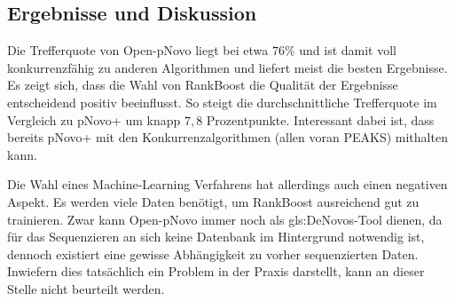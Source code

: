 \documentclass[a4paper, 12pt]{article}
\newcommand{\gerquot}[1]{\glqq#1\grqq}
\begin{document}
\subsection{Ergebnisse und Diskussion}
Die Trefferquote von Open-pNovo liegt bei etwa $ 76 \% $ und ist damit voll konkurrenzfähig zu anderen Algorithmen und liefert meist die besten Ergebnisse. Es zeigt sich, dass die Wahl von RankBoost die Qualität der Ergebnisse entscheidend positiv beeinflusst. So steigt die durchschnittliche Trefferquote im Vergleich zu pNovo+ um knapp $ 7,8 $ Prozentpunkte. Interessant dabei ist, dass bereits pNovo+ mit den Konkurrenzalgorithmen (allen voran PEAKS) mithalten kann.

Die Wahl eines Machine-Learning Verfahrens hat allerdings auch einen negativen Aspekt. Es werden viele Daten benötigt, um RankBoost ausreichend gut zu trainieren. Zwar kann Open-pNovo immer noch als \gls{gls:DeNovo}s-Tool dienen, da für das Sequenzieren an sich keine Datenbank im Hintergrund notwendig ist, dennoch existiert eine gewisse \gerquot{Abhängigkeit} zu vorher sequenzierten Daten. Inwiefern dies tatsächlich ein Problem in der Praxis darstellt, kann an dieser Stelle nicht beurteilt werden.

\begingroup
\printbibliography
\endgroup
\end{document}
